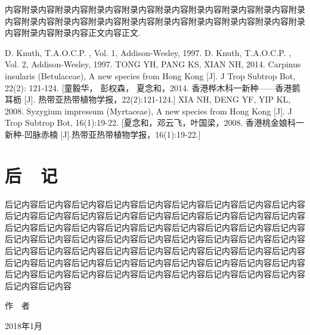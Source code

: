 \documentclass[utf8]{book}
\begin{document}
	内容附录内容附录内容附录内容附录内容附录内容附录内容附录内容附录内容附录内容附录内容附录内容附录内容附录内容附录内容附录内容附录内容附录内容附录内容附录内容附录内容正文内容正文\cite{DK1}.
	\renewcommand\indexname{索~~引}
	\printindex
	
	\backmatter
	
	
	\begin{thebibliography}{参考文献}
		 D. Knuth, T.A.O.C.P. , Vol. 1, Addison-Wesley, 1997.
		 D. Knuth, T.A.O.C.P. , Vol. 2, Addison-Wesley, 1997.
		 TONG YH, PANG KS, XIAN NH, 2014. Carpinus insularis (Betulaceae), A new species from Hong Kong [J]. J Trop Subtrop Bot, 22(2): 121-124. [童毅华， 彭权森， 夏念和，2014. 香港桦木科一新种——香港鹅耳枥 [J]. 热带亚热带植物学报，22(2):121-124.]
		 XIA NH, DENG YF, YIP KL, 2008. Syzygium impressum (Myrtaceae), A new species from Hong Kong [J]. J Trop Subtrop Bot, 16(1):19-22. [夏念和，邓云飞，叶国梁，2008. 香港桃金娘科一新种-凹脉赤楠 [J].热带亚热带植物学报，16(1):19-22.]
	\end{thebibliography}
	
	\chapter{后~~记}
	
	后记内容后记内容后记内容后记内容后记内容后记内容后记内容后记内容后记内容后记内容后记内容后记内容后记内容后记内容后记内容后记内容后记内容后记内容后记内容后记内容后记内容后记内容后记内容后记内容后记内容后记内容后记内容后记内容后记内容后记内容后记内容后记内容后记内容后记内容后记内容后记内容后记内容后记内容后记内容后记内容后记内容后记内容后记内容后记内容后记内容后记内容后记内容后记内容后记内容后记内容后记内容后记内容后记内容后记内容后记内容后记内容后记内容后记内容后记内容后记内容后记内容后记内容后记内容后记内容后记内容
	
	\begin{flushright}
		作~~者~~~~~~~~~
		
		2018年1月~~~~~
	\end{flushright}
	
\end{document}
